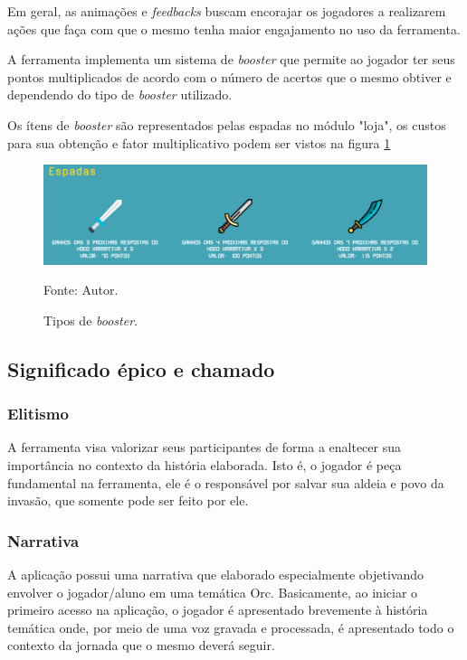 Em geral, as animações e \textit{feedbacks} buscam encorajar os jogadores a realizarem ações que faça com que o mesmo tenha maior engajamento no uso
da ferramenta.

A ferramenta implementa um sistema de \textit{booster} que permite ao jogador ter seus pontos multiplicados
de acordo com o número de acertos que o mesmo obtiver e dependendo do tipo de \textit{booster} utilizado.

Os ítens de \textit{booster} são representados pelas espadas no módulo "loja", os custos para sua obtenção 
e fator multiplicativo podem ser vistos na figura \ref{espadas}

\begin{figure}[h]
	\centering
	\includegraphics[keepaspectratio=true,scale=0.4]{figuras/espadas.png}
	\caption{Tipos de \textit{booster}.}
	Fonte: Autor.
	\label{espadas}
\end{figure}

\subsection{Significado épico e chamado}
\subsubsection{Elitismo}
A ferramenta visa valorizar seus participantes de forma a enaltecer sua importância no contexto da história 
elaborada. Isto é, o jogador é peça fundamental na ferramenta, ele é o responsável por salvar sua aldeia e povo
da invasão, que somente pode ser feito por ele.


\subsubsection{Narrativa}
A aplicação possui uma narrativa que elaborado especialmente objetivando envolver o jogador/aluno
em uma temática Orc. Basicamente, ao iniciar o primeiro acesso na aplicação, o jogador é apresentado brevemente à história temática onde,
por meio de uma voz gravada e processada, é apresentado todo o contexto da jornada que o mesmo deverá seguir.

